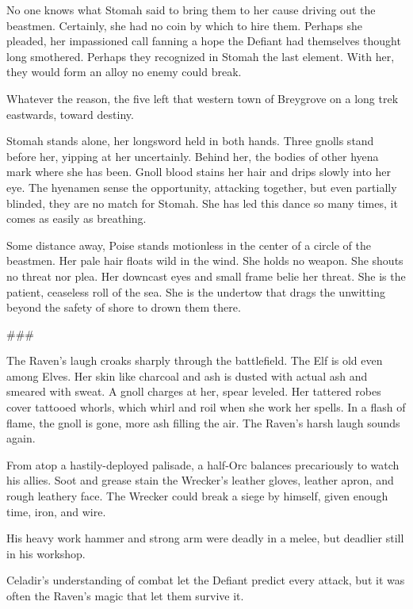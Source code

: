 No one knows what Stomah said to bring them to her cause driving out the beastmen.
Certainly, she had no coin by which to hire them.
Perhaps she pleaded, her impassioned call fanning a hope the Defiant had themselves
  thought long smothered.
Perhaps they recognized in Stomah the last element.
With her, they would form an alloy no enemy could break.

Whatever the reason, the five left that western town of Breygrove on a long trek eastwards, toward
destiny.

\hrulefill

Stomah stands alone, her longsword held in both hands.
Three gnolls stand before her, yipping at her uncertainly.
Behind her, the bodies of other hyena mark where she has been.
Gnoll blood stains her hair and drips slowly into her eye.
The hyenamen sense the opportunity, attacking together, but even partially blinded, they are no
  match for Stomah.
She has led this dance so many times, it comes as easily as breathing.

Some distance away, Poise stands motionless in the center of a circle of the beastmen.
Her pale hair floats wild in the wind.
She holds no weapon.
She shouts no threat nor plea.
Her downcast eyes and small frame belie her threat.
She is the patient, ceaseless roll of the sea.
She is the undertow that drags the unwitting beyond the safety of shore to drown them there.

###

The Raven's laugh croaks sharply through the battlefield.
The Elf is old even among Elves.
Her skin like charcoal and ash is dusted with actual ash and smeared with sweat.
A gnoll charges at her, spear leveled.
Her tattered robes cover tattooed whorls, which whirl and roil when she work her spells.
In a flash of flame, the gnoll is gone, more ash filling the air.
The Raven's harsh laugh sounds again.

From atop a hastily-deployed palisade, a half-Orc balances precariously to watch his allies.
Soot and grease stain the Wrecker's leather gloves, leather apron, and rough leathery face.
The Wrecker could break a siege by himself, given enough time, iron, and wire.


His heavy work hammer and strong arm were deadly in a melee, but deadlier still in his workshop.









Celadir's understanding of combat let the Defiant predict every attack,
but it was often the Raven's magic that let them survive it.


